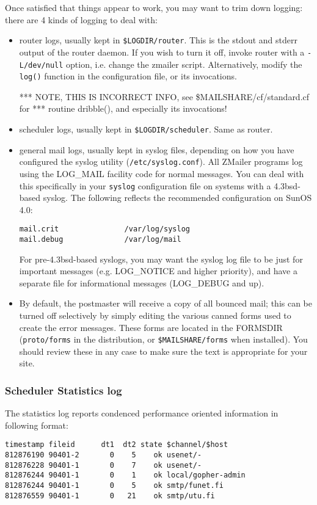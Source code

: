 Once satisfied that things appear to work, you may want to trim down
logging: there are 4 kinds of logging to deal with:
\begin{itemize}
\item router logs, usually kept in {\tt \$LOGDIR/router}.  This is the stdout
and stderr output of the router daemon.  If you wish to turn it off,
invoke router with a {\tt -L/dev/null} option, i.e. change the zmailer
script.  Alternatively, modify the {\tt log()} function in the
configuration file, or its invocations.

*** NOTE, THIS IS INCORRECT INFO, see  \$MAILSHARE/cf/standard.cf for
*** routine   dribble(),  and especially its invocations!
\item scheduler logs, usually kept in {\tt \$LOGDIR/scheduler}.  Same as router.
\item general mail logs, usually kept in syslog files, depending on how
you have configured the syslog utility ({\tt /etc/syslog.conf}).  All
ZMailer programs log using the LOG\_MAIL facility code for normal
messages.  You can deal with this specifically in your {\tt syslog}
configuration file on systems with a 4.3bsd-based syslog.  The
following reflects the recommended configuration on SunOS 4.0:
\begin{verbatim}
mail.crit               /var/log/syslog
mail.debug              /var/log/mail
\end{verbatim}

For pre-4.3bsd-based syslogs, you may want the syslog log file
to be just for important messages (e.g. LOG\_NOTICE and higher
priority), and have a separate file for informational messages
(LOG\_DEBUG and up).
\item By default, the postmaster will receive a copy of all bounced
mail; this can be turned off selectively by simply editing the
various canned forms used to create the error messages.  These
forms are located in the FORMSDIR ({\tt proto/forms} in the distribution,
or {\tt \$MAILSHARE/forms} when installed).  You should review these
in any case to make sure the text is appropriate for your site.
\end{itemize}




\subsubsection{Scheduler Statistics log}

The  statistics log reports condenced performance oriented
information in following format:
\begin{verbatim}
timestamp fileid      dt1  dt2 state $channel/$host
812876190 90401-2       0    5    ok usenet/-
812876228 90401-1       0    7    ok usenet/-
812876244 90401-1       0    1    ok local/gopher-admin
812876244 90401-1       0    5    ok smtp/funet.fi
812876559 90401-1       0   21    ok smtp/utu.fi
\end{verbatim}

